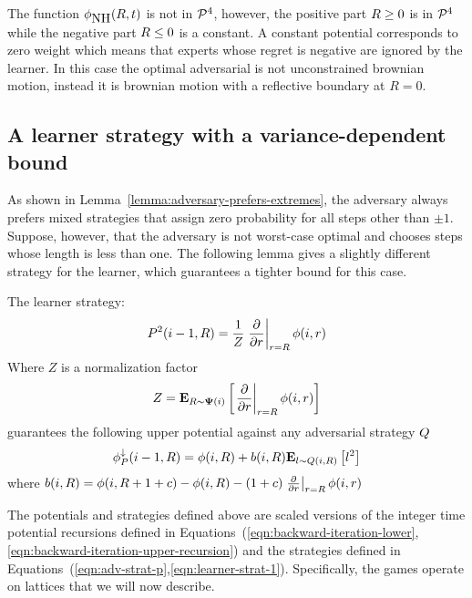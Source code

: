 \documentclass[anon,12pt]{colt2024} %
\begin{document}
The function $\phi_{\mbox{NH}}(R,t)$ is not in ${\cal P}^{4}$, however, the
positive part $R\geq 0$ is in ${\cal P}^{4}$ while the negative part
$R \leq 0$ is a constant. A constant potential corresponds to zero weight which means that experts whose regret is negative are ignored by the learner. In this case the optimal adversarial is not unconstrained brownian motion, instead it is brownian motion with a reflective boundary at $R=0$.

  \subsection{A learner strategy with a variance-dependent bound}

  As shown in Lemma~\ref{lemma:adversary-prefers-extremes}, the
  adversary always prefers mixed strategies that assign zero
  probability for all steps other than $\pm 1$. Suppose, however, that
  the adversary is not worst-case optimal and chooses steps whose
  length is less than one. The following lemma gives a slightly
  different strategy for the learner, which guarantees a tighter bound
  for this case.

  \begin{lemma} \label{lemma:second-order-bound}
      The learner strategy:
      \begin{equation} \label{eqn:learner-strat-2}
      P^2(i-1,R) =  \frac{1}{Z}
      \left. \frac{\partial}{\partial r} \right|_{r=R} \phi(i,r)
      \end{equation}
      Where $Z$ is a normalization factor
      $$Z = {\bf E}_{R \sim {\bf \Psi}(i)}\left[ \left. \frac{\partial}{\partial r} \right|_{r=R} \phi(i,r) \right]$$
      guarantees the following upper potential against any adversarial
      strategy $Q$
      \begin{equation} \label{eqn:value-iteration-upper}
        \phi_{P}^{\downarrow}(i-1, R) = \phi(i,R) + b(i,R) {\bf E}_{l \sim Q(i,R)}\left[ l^2 \right]
      \end{equation}
      where $b(i,R) = \phi(i,R+1+c) -\phi(i,R) - (1+c) \left. \frac{\partial}{\partial r} \right|_{r=R} \phi(i,r)$
   \end{lemma}


The potentials and strategies defined above are scaled versions of the
integer time potential recursions defined in
Equations~(\ref{eqn:backward-iteration-lower},\ref{eqn:backward-iteration-upper-recursion})
and the strategies defined in Equations~(\ref{eqn:adv-strat-p},\ref{eqn:learner-strat-1}). Specifically, the games operate on lattices that we will now describe.
\end{document}
